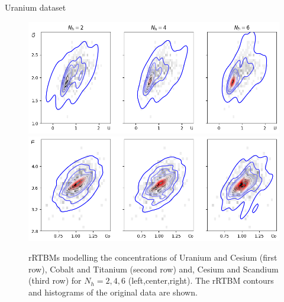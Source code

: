 \documentclass[10pt]{beamer}
\begin{document}
\begin{frame}{Uranium dataset}

    \begin{figure}
        \includegraphics[scale=0.5]{figures/uranium15.png}
        \includegraphics[scale=0.5]{figures/uranium37.png}

            \caption{rRTBMs modelling the concentrations of Uranium
            and Cesium (first row), Cobalt and Titanium (second row) and, Cesium and Scandium (third row) for $N_h = 2,4,6$ (left,center,right).
                 The rRTBM contours and histograms of the original data are shown.}
    \end{figure}
    
    
\end{frame}
\end{document}
